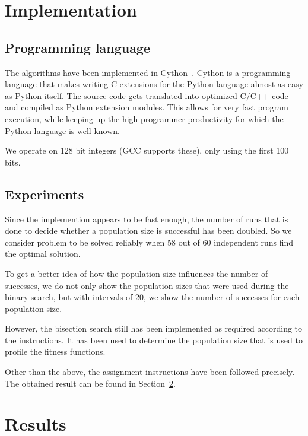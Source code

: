 \documentclass[12pt]{article}
\theoremstyle{definition}
\begin{document}
\maketitle

\section{Implementation}

\subsection*{Programming language}
The algorithms have been implemented in Cython~\cite{cython}.
Cython is a programming language that makes writing C extensions for the Python language almost as easy as Python itself.
The source code gets translated into optimized C/C++ code and compiled as Python extension modules.
This allows for very fast program execution, while keeping up the high programmer productivity for which the Python language is well known.

We operate on 128 bit integers (GCC supports these), only using the first 100 bits.

\subsection*{Experiments}
Since the implemention appears to be fast enough, the number of runs that is done to decide whether a population size is successful has been doubled.
So we consider problem to be solved reliably when 58 out of 60 independent runs find the optimal solution.

To get a better idea of how the population size influences the number of successes, we do not only show the population sizes that were used during the binary search, but with intervals of 20, we show the number of successes for each population size.

However, the bisection search still has been implemented as required according to the instructions.
It has been used to determine the population size that is used to profile the fitness functions.

Other than the above, the assignment instructions have been followed precisely.
The obtained result can be found in Section~\ref{observations}.


\section{Results}
\label{observations}
\end{document}
